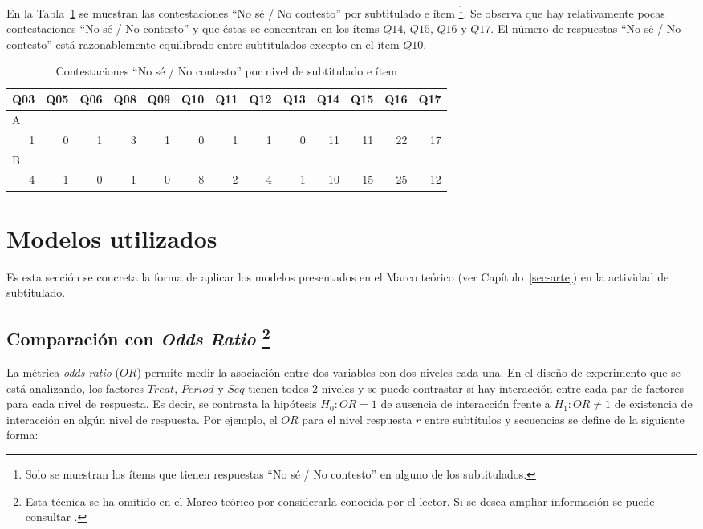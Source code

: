 \documentclass[
  12pt,
  a4paper,
  extrafontsizes,
  onecolumn,
  openright,
  table]{memoir}
\begin{document}
En la Tabla~\ref{tbl-no-response} se muestran las contestaciones
\enquote{No sé / No contesto} por subtitulado e ítem \footnote{Solo se
  muestran los ítems que tienen respuestas \enquote{No sé / No contesto}
  en alguno de los subtitulados.}. Se observa que hay relativamente
pocas contestaciones \enquote{No sé / No contesto} y que éstas se
concentran en los ítems \(Q14\), \(Q15\), \(Q16\) y \(Q17\). El número
de respuestas \enquote{No sé / No contesto} está razonablemente
equilibrado entre subtitulados excepto en el ítem \(Q10\).

\small

\hypertarget{tbl-no-response}{}
\begin{longtable}{rrrrrrrrrrrrr}
\caption{\label{tbl-no-response}Contestaciones ``No sé / No contesto'' por nivel de subtitulado e ítem }\tabularnewline

\toprule
Q03 & Q05 & Q06 & Q08 & Q09 & Q10 & Q11 & Q12 & Q13 & Q14 & Q15 & Q16 & Q17 \\ 
\midrule
\multicolumn{13}{l}{A} \\ 
\midrule
1 & 0 & 1 & 3 & 1 & 0 & 1 & 1 & 0 & 11 & 11 & 22 & 17 \\ 
\midrule
\multicolumn{13}{l}{B} \\ 
4 & 1 & 0 & 1 & 0 & 8 & 2 & 4 & 1 & 10 & 15 & 25 & 12 \\ 
\bottomrule
\end{longtable}

\normalsize

\hypertarget{sec-modelos-utilizados}{%
\section{Modelos utilizados}\label{sec-modelos-utilizados}}

Es esta sección se concreta la forma de aplicar los modelos presentados
en el Marco teórico (ver Capítulo~\ref{sec-arte}) en la actividad de
subtitulado.

\hypertarget{sec-or-2}{%
\subsection[Comparación con \emph{Odds Ratio}
]{\texorpdfstring{Comparación con \emph{Odds Ratio}
\footnote{Esta técnica se ha omitido en el Marco teórico por
  considerarla conocida por el lector. Si se desea ampliar información
  se puede consultar \textcite[p.~18]{agresti2010}.}}{Comparación con Odds Ratio }}\label{sec-or-2}}

La métrica \emph{\gls{odds ratio}} (\(OR\)) permite medir la asociación
entre dos variables con dos niveles cada una. En el diseño de
experimento que se está analizando, los factores \(Treat\), \(Period\) y
\(Seq\) tienen todos 2 niveles y se puede contrastar si hay interacción
entre cada par de factores para cada nivel de respuesta. Es decir, se
contrasta la hipótesis \(H_0: OR=1\) de ausencia de interacción frente a
\(H_1: OR \neq 1\) de existencia de interacción en algún nivel de
respuesta. Por ejemplo, el \(OR\) para el nivel respuesta \(r\) entre
subtítulos y secuencias se define de la siguiente forma:
\end{document}
